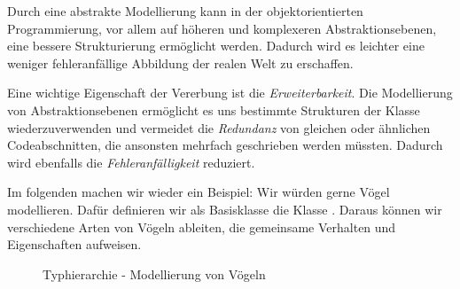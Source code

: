 \documentclass{tuda-pub}
\begin{document}
  Durch eine abstrakte Modellierung kann in der objektorientierten Programmierung, vor allem auf
  höheren und komplexeren Abstraktionsebenen, eine bessere Strukturierung ermöglicht werden.
  Dadurch wird es leichter eine weniger fehleranfällige Abbildung der realen Welt zu erschaffen.
  \br

  Eine wichtige Eigenschaft der Vererbung ist die \textit{Erweiterbarkeit}. Die Modellierung von
  Abstraktionsebenen ermöglicht es uns bestimmte Strukturen der Klasse wiederzuverwenden und
  vermeidet die \textit{Redundanz} von gleichen oder ähnlichen Codeabschnitten, die ansonsten
  mehrfach geschrieben werden müssten. Dadurch wird ebenfalls die \textit{Fehleranfälligkeit}
  reduziert.

  \clearpage

  Im folgenden machen wir wieder ein Beispiel: Wir würden gerne Vögel modellieren. Dafür
  definieren wir als Basisklasse die Klasse . Daraus können wir verschiedene
  Arten von Vögeln ableiten, die gemeinsame Verhalten und Eigenschaften aufweisen.

  \begin{figure}[h]
    \centering
    \caption{Typhierarchie - Modellierung von Vögeln}
    \label{fig:Type_hierarchy_Bird}
  \end{figure}
\end{document}
